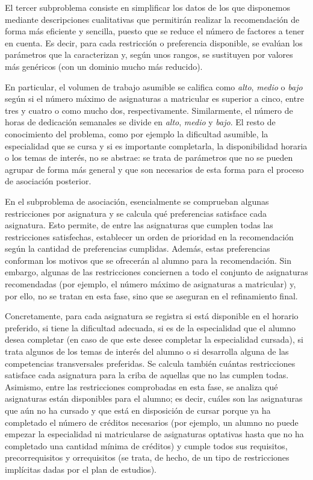 El tercer subproblema consiste en simplificar los datos de los que disponemos 
mediante descripciones cualitativas que permitirán realizar la recomendación 
de forma más eficiente y sencilla, puesto que se reduce el número de factores 
a tener en cuenta. Es decir, para cada restricción o preferencia disponible, 
se evalúan los parámetros que la caracterizan y, según unos rangos, se 
sustituyen por valores más genéricos (con un dominio mucho más reducido). 

En particular, el volumen de trabajo asumible se califica como \textit{alto}, 
\textit{medio} o \textit{bajo} según si el número máximo de asignaturas a 
matricular es superior a cinco, entre tres y cuatro o como mucho dos, 
respectivamente. Similarmente, el número de horas de dedicación semanales se 
divide en \textit{alto}, \textit{medio} y \textit{bajo}. 
El resto de conocimiento del problema, como por ejemplo la dificultad 
asumible, la especialidad que se cursa y si es importante completarla, la 
disponibilidad horaria o los temas de interés, no se abstrae: se trata de 
parámetros que no se pueden agrupar de forma más general y que son necesarios 
de esta forma para el proceso de asociación posterior.

En el subproblema de asociación, esencialmente se comprueban algunas 
restricciones por asignatura y se calcula qué preferencias satisface cada 
asignatura. Esto permite, de entre las asignaturas que cumplen todas las 
restricciones satisfechas, establecer un orden de prioridad en la 
recomendación según la cantidad de preferencias cumplidas. Además, estas 
preferencias conforman los motivos que se ofrecerán al alumno para la 
recomendación. Sin embargo, algunas de las restricciones conciernen a todo 
el conjunto de asignaturas recomendadas (por ejemplo, el número máximo de 
asignaturas a matricular) y, por ello, no se tratan en esta fase, sino que 
se aseguran en el refinamiento final.

Concretamente, para cada asignatura se registra si está disponible en el 
horario preferido, si tiene la dificultad adecuada, si es de la especialidad 
que el alumno desea completar (en caso de que este desee completar la 
especialidad cursada), si trata algunos de los temas de interés del alumno 
o si desarrolla alguna de las competencias transversales preferidas. Se 
calcula también cuántas restricciones satisface cada asignatura para la criba 
de aquellas que no las cumplen todas. Asimismo, entre las restricciones 
comprobadas en esta fase, se analiza qué asignaturas están disponibles para 
el alumno; es decir, cuáles son las asignaturas que aún no ha cursado y 
que está en disposición de cursar porque ya ha completado el número de 
créditos necesarios (por ejemplo, un alumno no puede empezar la especialidad 
ni matricularse de asignaturas optativas hasta que no ha completado una 
cantidad mínima de créditos) y cumple todos sus requisitos, precorrequisitos 
y orrequisitos (se trata, de hecho, de un tipo de restricciones implícitas 
dadas por el plan de estudios).

